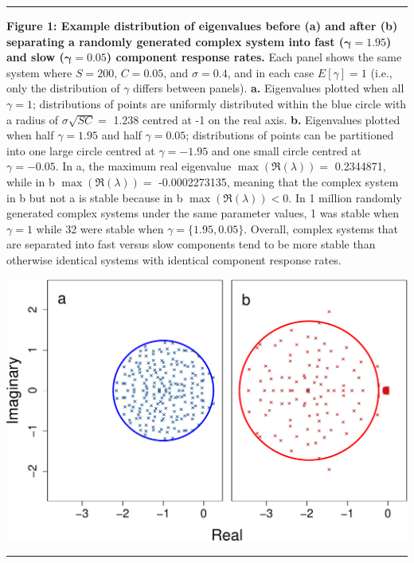 \documentclass[]{article}
\begin{document}
\begin{center}\rule{0.5\linewidth}{\linethickness}\end{center}

\textbf{Figure 1: Example distribution of eigenvalues before (a) and
after (b) separating a randomly generated complex system into fast
(\(\boldsymbol{\gamma} = 1.95\)) and slow
(\(\boldsymbol{\gamma} = 0.05\)) component response rates.} Each panel
shows the same system where \(S = 200\), \(C = 0.05\), and
\(\sigma = 0.4\), and in each case \(E[\gamma] = 1\) (i.e., only the
distribution of \(\gamma\) differs between panels). \textbf{a.}
Eigenvalues plotted when all \(\gamma = 1\); distributions of points are
uniformly distributed within the blue circle with a radius of
\(\sigma\sqrt{SC} =\) 1.238 centred at -1 on the real axis. \textbf{b.}
Eigenvalues plotted when half \(\gamma = 1.95\) and half
\(\gamma = 0.05\); distributions of points can be partitioned into one
large circle centred at \(\gamma = -1.95\) and one small circle centred
at \(\gamma = -0.05\). In a, the maximum real eigenvalue
\(\max\left(\Re(\lambda)\right) =\) 0.2344871, while in b
\(\max\left(\Re(\lambda)\right) =\) -0.0002273135, meaning that the
complex system in b but not a is stable because in b
\(\max\left(\Re(\lambda)\right) < 0\). In 1 million randomly generated
complex systems under the same parameter values, 1 was stable when
\(\gamma = 1\) while 32 were stable when \(\gamma = \{1.95, 0.05\}\).
Overall, complex systems that are separated into fast versus slow
components tend to be more stable than otherwise identical systems with
identical component response rates.

\includegraphics{unnamed-chunk-10-1.pdf}

\begin{center}\rule{0.5\linewidth}{\linethickness}\end{center}
\end{document}
